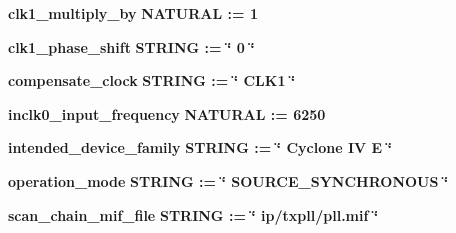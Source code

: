 \begin{DoxyCompactItemize}
\item 
{\bf clk1\+\_\+multiply\+\_\+by} {\bfseries {\bfseries \textcolor{comment}{N\+A\+T\+U\+R\+AL}\textcolor{vhdlchar}{ }\textcolor{vhdlchar}{ }\textcolor{vhdlchar}{\+:}\textcolor{vhdlchar}{=}\textcolor{vhdlchar}{ }\textcolor{vhdlchar}{ } \textcolor{vhdldigit}{1} \textcolor{vhdlchar}{ }}}
\item 
{\bf clk1\+\_\+phase\+\_\+shift} {\bfseries {\bfseries \textcolor{comment}{S\+T\+R\+I\+NG}\textcolor{vhdlchar}{ }\textcolor{vhdlchar}{ }\textcolor{vhdlchar}{\+:}\textcolor{vhdlchar}{=}\textcolor{vhdlchar}{ }\textcolor{vhdlchar}{ }\textcolor{vhdlchar}{ }\textcolor{vhdlchar}{ }\textcolor{keyword}{\char`\"{} 0 \char`\"{}}\textcolor{vhdlchar}{ }}}
\item 
{\bf compensate\+\_\+clock} {\bfseries {\bfseries \textcolor{comment}{S\+T\+R\+I\+NG}\textcolor{vhdlchar}{ }\textcolor{vhdlchar}{ }\textcolor{vhdlchar}{\+:}\textcolor{vhdlchar}{=}\textcolor{vhdlchar}{ }\textcolor{vhdlchar}{ }\textcolor{vhdlchar}{ }\textcolor{vhdlchar}{ }\textcolor{keyword}{\char`\"{} C\+L\+K1 \char`\"{}}\textcolor{vhdlchar}{ }}}
\item 
{\bf inclk0\+\_\+input\+\_\+frequency} {\bfseries {\bfseries \textcolor{comment}{N\+A\+T\+U\+R\+AL}\textcolor{vhdlchar}{ }\textcolor{vhdlchar}{ }\textcolor{vhdlchar}{\+:}\textcolor{vhdlchar}{=}\textcolor{vhdlchar}{ }\textcolor{vhdlchar}{ } \textcolor{vhdldigit}{6250} \textcolor{vhdlchar}{ }}}
\item 
{\bf intended\+\_\+device\+\_\+family} {\bfseries {\bfseries \textcolor{comment}{S\+T\+R\+I\+NG}\textcolor{vhdlchar}{ }\textcolor{vhdlchar}{ }\textcolor{vhdlchar}{\+:}\textcolor{vhdlchar}{=}\textcolor{vhdlchar}{ }\textcolor{vhdlchar}{ }\textcolor{vhdlchar}{ }\textcolor{vhdlchar}{ }\textcolor{keyword}{\char`\"{} Cyclone I\+V E \char`\"{}}\textcolor{vhdlchar}{ }}}
\item 
{\bf operation\+\_\+mode} {\bfseries {\bfseries \textcolor{comment}{S\+T\+R\+I\+NG}\textcolor{vhdlchar}{ }\textcolor{vhdlchar}{ }\textcolor{vhdlchar}{\+:}\textcolor{vhdlchar}{=}\textcolor{vhdlchar}{ }\textcolor{vhdlchar}{ }\textcolor{vhdlchar}{ }\textcolor{vhdlchar}{ }\textcolor{keyword}{\char`\"{} S\+O\+U\+R\+C\+E\+\_\+\+S\+Y\+N\+C\+H\+R\+O\+N\+O\+U\+S \char`\"{}}\textcolor{vhdlchar}{ }}}
\item 
{\bf scan\+\_\+chain\+\_\+mif\+\_\+file} {\bfseries {\bfseries \textcolor{comment}{S\+T\+R\+I\+NG}\textcolor{vhdlchar}{ }\textcolor{vhdlchar}{ }\textcolor{vhdlchar}{\+:}\textcolor{vhdlchar}{=}\textcolor{vhdlchar}{ }\textcolor{vhdlchar}{ }\textcolor{vhdlchar}{ }\textcolor{vhdlchar}{ }\textcolor{keyword}{\char`\"{} ip/txpll/pll.\+mif \char`\"{}}\textcolor{vhdlchar}{ }}}

\end{DoxyCompactItemize}
